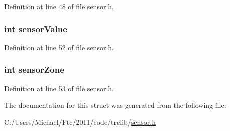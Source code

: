 Definition at line 48 of file sensor.h.

\hypertarget{struct_s_e_n_s_o_r_abc6f4a0d968d01ae532d5df65e89439b}{
\subsubsection[{sensorValue}]{\setlength{\rightskip}{0pt plus 5cm}int {\bf sensorValue}}}
\label{struct_s_e_n_s_o_r_abc6f4a0d968d01ae532d5df65e89439b}


Definition at line 52 of file sensor.h.

\hypertarget{struct_s_e_n_s_o_r_a1ca477e768ccbd326c7ec16a5a65bce4}{
\subsubsection[{sensorZone}]{\setlength{\rightskip}{0pt plus 5cm}int {\bf sensorZone}}}
\label{struct_s_e_n_s_o_r_a1ca477e768ccbd326c7ec16a5a65bce4}


Definition at line 53 of file sensor.h.



The documentation for this struct was generated from the following file:\begin{DoxyCompactItemize}
\item 
C:/Users/Michael/Ftc/2011/code/trclib/\hyperlink{sensor_8h}{sensor.h}\end{DoxyCompactItemize}
